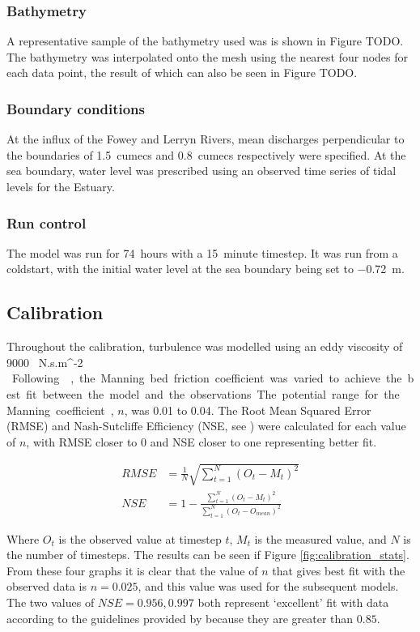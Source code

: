\documentclass{article}
\begin{document}
\subsubsection{Bathymetry}
A representative sample of the bathymetry used was is shown in Figure TODO. The bathymetry was interpolated onto the mesh using the nearest four nodes for each data point, the result of which can also be seen in Figure TODO.

\subsubsection{Boundary conditions}
At the influx of the Fowey and Lerryn Rivers, mean discharges perpendicular to the boundaries of \SI{1.5}{cumecs} and \SI{0.8}{cumecs} respectively were specified. At the sea boundary, water level was prescribed using an observed time series of tidal levels for the Estuary.

\subsubsection{Run control}
The model was run for \SI{74}{hours} with a \SI{15}{minute} timestep. It was run from a coldstart, with the initial water level at the sea boundary being set to \SI{-0.72}{m}. 

\subsection{Calibration}

Throughout the calibration, turbulence was modelled using an eddy viscosity of \SI{9000}{ N.s.m^{-2} }.
Following \textcite{piedra2007residual, sousa2007hydrodynamic}, the  Manning bed friction coefficient was varied to achieve the best fit between the model and the observations. The potential range for the Manning coefficient, $n$, was 0.01 to 0.04. The Root Mean Squared Error (RMSE) and Nash-Sutcliffe Efficiency (NSE, see \textcite{nash1970river}) were calculated for each value of $n$, with RMSE closer to 0 and NSE closer to one representing better fit.

\begin{align*}
    RMSE &= \frac{1}{N} \sqrt{ \sum_{t = 1}^N ( O_t - M_t) ^ 2 }\\
    NSE  &= 1 - \frac{\sum_{t = 1}^N ( O_t - M_t) ^ 2 }{\sum_{t = 1}^N ( O_t - O_{mean}) ^ 2 }
\end{align*}

Where $O_t$ is the observed value at timestep $t$, $M_t$ is the measured value, and $N$ is the number of timesteps. The results can be seen if Figure \ref{fig:calibration_stats}. From these four graphs it is clear that the value of $n$ that gives best fit with the observed data is $n = 0.025$, and this value was used for the subsequent models. The two values of $NSE = 0.956, 0.997$ both represent `excellent' fit with data according to the guidelines provided by \textcite{henriksen2008assessment} because they are greater than $0.85$. 
\end{document}
